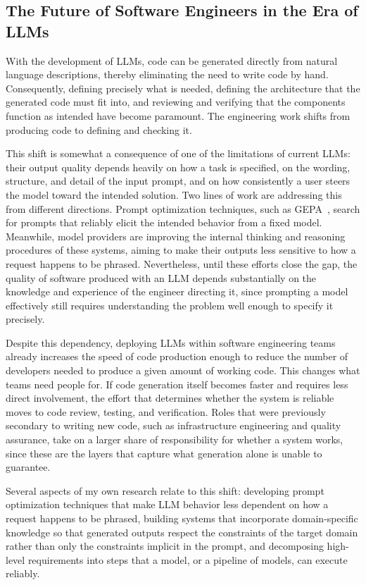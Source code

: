 \documentclass[11pt]{article}
\begin{document}
\subsection{The Future of Software Engineers in the Era of LLMs}

With the development of LLMs, code can be generated directly from natural language descriptions, thereby eliminating the need to write code by hand. Consequently, defining precisely what is needed, defining the architecture that the generated code must fit into, and reviewing and verifying that the components function as intended have become paramount. The engineering work shifts from producing code to defining and checking it.

This shift is somewhat a consequence of one of the limitations of current LLMs: their output quality depends heavily on how a task is specified, on the wording, structure, and detail of the input prompt, and on how consistently a user steers the model toward the intended solution. Two lines of work are addressing this from different directions. Prompt optimization techniques, such as GEPA~\citep{agrawal2026gepa}, search for prompts that reliably elicit the intended behavior from a fixed model. Meanwhile, model providers are improving the internal thinking and reasoning procedures of these systems, aiming to make their outputs less sensitive to how a request happens to be phrased. Nevertheless, until these efforts close the gap, the quality of software produced with an LLM depends substantially on the knowledge and experience of the engineer directing it, since prompting a model effectively still requires understanding the problem well enough to specify it precisely.

Despite this dependency, deploying LLMs within software engineering teams already increases the speed of code production enough to reduce the number of developers needed to produce a given amount of working code. This changes what teams need people for. If code generation itself becomes faster and requires less direct involvement, the effort that determines whether the system is reliable moves to code review, testing, and verification. Roles that were previously secondary to writing new code, such as infrastructure engineering and quality assurance, take on a larger share of responsibility for whether a system works, since these are the layers that capture what generation alone is unable to guarantee.

Several aspects of my own research relate to this shift: developing prompt optimization techniques that make LLM behavior less dependent on how a request happens to be phrased, building systems that incorporate domain-specific knowledge so that generated outputs respect the constraints of the target domain rather than only the constraints implicit in the prompt, and decomposing high-level requirements into steps that a model, or a pipeline of models, can execute reliably.
\end{document}
